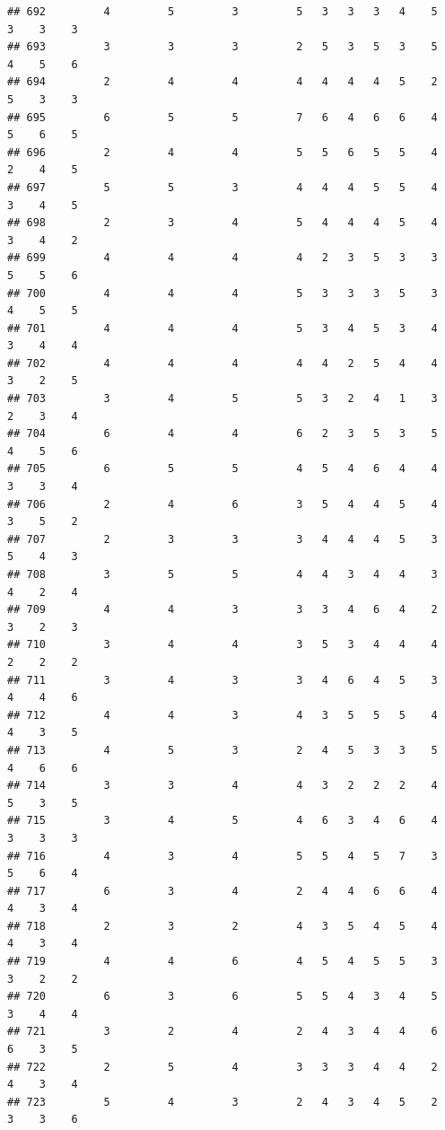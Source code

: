 \documentclass[
]{article}
\begin{document}
\begin{verbatim}
## 692         4         5         3         5   3   3   3   4    5    3    3    3
## 693         3         3         3         2   5   3   5   3    5    4    5    6
## 694         2         4         4         4   4   4   4   5    2    5    3    3
## 695         6         5         5         7   6   4   6   6    4    5    6    5
## 696         2         4         4         5   5   6   5   5    4    2    4    5
## 697         5         5         3         4   4   4   5   5    4    3    4    5
## 698         2         3         4         5   4   4   4   5    4    3    4    2
## 699         4         4         4         4   2   3   5   3    3    5    5    6
## 700         4         4         4         5   3   3   3   5    3    4    5    5
## 701         4         4         4         5   3   4   5   3    4    3    4    4
## 702         4         4         4         4   4   2   5   4    4    3    2    5
## 703         3         4         5         5   3   2   4   1    3    2    3    4
## 704         6         4         4         6   2   3   5   3    5    4    5    6
## 705         6         5         5         4   5   4   6   4    4    3    3    4
## 706         2         4         6         3   5   4   4   5    4    3    5    2
## 707         2         3         3         3   4   4   4   5    3    5    4    3
## 708         3         5         5         4   4   3   4   4    3    4    2    4
## 709         4         4         3         3   3   4   6   4    2    3    2    3
## 710         3         4         4         3   5   3   4   4    4    2    2    2
## 711         3         4         3         3   4   6   4   5    3    4    4    6
## 712         4         4         3         4   3   5   5   5    4    4    3    5
## 713         4         5         3         2   4   5   3   3    5    4    6    6
## 714         3         3         4         4   3   2   2   2    4    5    3    5
## 715         3         4         5         4   6   3   4   6    4    3    3    3
## 716         4         3         4         5   5   4   5   7    3    5    6    4
## 717         6         3         4         2   4   4   6   6    4    4    3    4
## 718         2         3         2         4   3   5   4   5    4    4    3    4
## 719         4         4         6         4   5   4   5   5    3    3    2    2
## 720         6         3         6         5   5   4   3   4    5    3    4    4
## 721         3         2         4         2   4   3   4   4    6    6    3    5
## 722         2         5         4         3   3   3   4   4    2    4    3    4
## 723         5         4         3         2   4   3   4   5    2    3    3    6

\end{verbatim}
\end{document}

